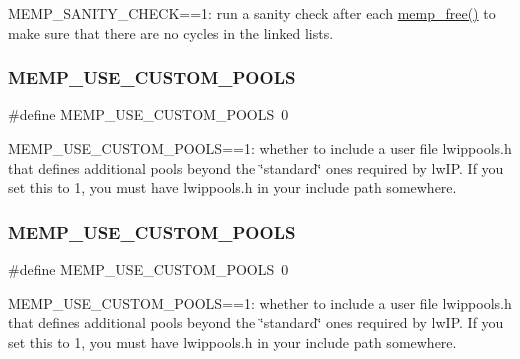 M\+E\+M\+P\+\_\+\+S\+A\+N\+I\+T\+Y\+\_\+\+C\+H\+E\+CK==1\+: run a sanity check after each \hyperlink{native_2lwip_2src_2core_2memp_8c_aecd94926b7c2a0e23ae195f4ae97581f}{memp\+\_\+free()} to make sure that there are no cycles in the linked lists. \mbox{\label{group__lwip__opts__mem_ga69de593b8ffd4f1c249f03e48e11983b}} 
\subsubsection{\texorpdfstring{M\+E\+M\+P\+\_\+\+U\+S\+E\+\_\+\+C\+U\+S\+T\+O\+M\+\_\+\+P\+O\+O\+LS}{MEMP\_USE\_CUSTOM\_POOLS}\hspace{0.1cm}{\footnotesize\ttfamily [1/2]}}
{\footnotesize\ttfamily \#define M\+E\+M\+P\+\_\+\+U\+S\+E\+\_\+\+C\+U\+S\+T\+O\+M\+\_\+\+P\+O\+O\+LS~0}

M\+E\+M\+P\+\_\+\+U\+S\+E\+\_\+\+C\+U\+S\+T\+O\+M\+\_\+\+P\+O\+O\+LS==1\+: whether to include a user file lwippools.\+h that defines additional pools beyond the \char`\"{}standard\char`\"{} ones required by lw\+IP. If you set this to 1, you must have lwippools.\+h in your include path somewhere. \mbox{\label{group__lwip__opts__mem_ga69de593b8ffd4f1c249f03e48e11983b}} 
\subsubsection{\texorpdfstring{M\+E\+M\+P\+\_\+\+U\+S\+E\+\_\+\+C\+U\+S\+T\+O\+M\+\_\+\+P\+O\+O\+LS}{MEMP\_USE\_CUSTOM\_POOLS}\hspace{0.1cm}{\footnotesize\ttfamily [2/2]}}
{\footnotesize\ttfamily \#define M\+E\+M\+P\+\_\+\+U\+S\+E\+\_\+\+C\+U\+S\+T\+O\+M\+\_\+\+P\+O\+O\+LS~0}

M\+E\+M\+P\+\_\+\+U\+S\+E\+\_\+\+C\+U\+S\+T\+O\+M\+\_\+\+P\+O\+O\+LS==1\+: whether to include a user file lwippools.\+h that defines additional pools beyond the \char`\"{}standard\char`\"{} ones required by lw\+IP. If you set this to 1, you must have lwippools.\+h in your include path somewhere. 